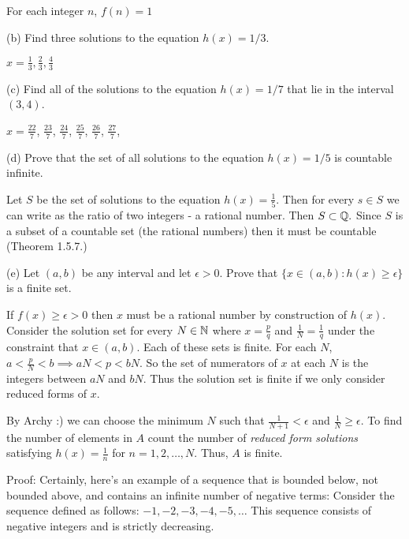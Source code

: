 \documentclass{report}
\begin{document}
\sol For each integer $n$, $f(n)=1$
\bigskip

(b) Find three solutions to the equation $h(x)=1 / 3$.

\sol $ x = \frac{1}{3}, \frac{2}{3}, \frac{4}{3}$

\bigskip
(c) Find all of the solutions to the equation $h(x)=1 / 7$ that lie in the interval $(3,4)$.

\sol $x = \frac{22}{7}$, $\frac{23}{7}$, $\frac{24}{7}$, $\frac{25}{7}$, $\frac{26}{7}$, $\frac{27}{7}$,

\bigskip
(d) Prove that the set of all solutions to the equation $h(x)=1 / 5$ is countable infinite.

\sol
\begin{myproof}
    Let $S$ be the set of solutions to the equation $h(x)= \frac{1}{5}.$ Then for every $s \in S$ we can write as the ratio of two integers - a rational number. Then $S \subset \QQ.$ Since $S$ is a subset of a countable set (the rational numbers) then it must be countable (Theorem 1.5.7.) 
\end{myproof}
\bigskip
(e) Let $(a, b)$ be any interval and let $\epsilon>0$. Prove that $\{x \in(a, b): h(x) \geq \epsilon\}$ is a finite set.
\par
\bigskip
\sol
If $f(x) \geq \epsilon > 0$ then $x$ must be a rational number by construction of $h(x).$  Consider the solution set for every $N\in \NN$ where $x = \frac{p}{q}$ and $\frac{1}{N} = \frac{1}{q}$ under the constraint that $x \in (a,b)$.  Each of these sets is finite. For each $N$, $ a < \frac{p}{N} < b \implies aN < p < bN.$ So the set of numerators of $x$ at each $N$ is the integers between $aN$ and $bN.$ Thus the solution set is finite if we only consider reduced forms of $x.$

By Archy :) we can choose the minimum $N$ such that $\frac{1}{N+1} < \epsilon$ and $\frac{1}{N} \geq \epsilon.$ To find the number of elements in $A$ count the number of \textit{reduced form solutions} satisfying $h(x) = \frac{1}{n}$ for $n = 1,2,\dots, N$. Thus, $A$ is finite.

\pagebreak
{}

Proof: Certainly, here's an example of a sequence that is bounded below, not bounded above, and contains an infinite number of negative terms:
Consider the sequence defined as follows: $-1,-2,-3,-4,-5, \ldots$
This sequence consists of negative integers and is strictly decreasing.
\end{document}
